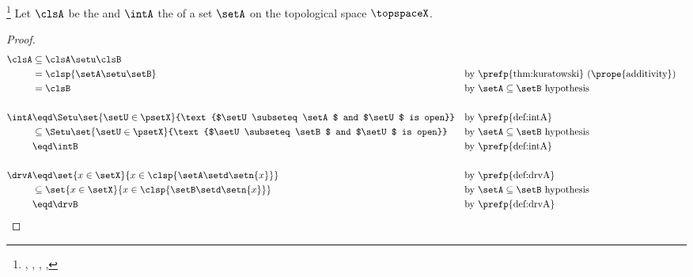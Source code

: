 \begin{theorem}
\footnote{
  , %
  ,
  , %
  ,
  }
\label{thm:clsA_isotone}
Let $\clsA$ be the  and $\intA$ the   of a set $\setA$ on the topological space $\topspaceX$.
\end{theorem}
\begin{proof}
\begin{align*}
  \clsA
    &\subseteq \clsA\setu\clsB
  \\&= \clsp{\setA\setu\setB}
    && \text{by \prefp{thm:kuratowski} (\prope{additivity})}
  \\&= \clsB
    && \text{by $\setA\subseteq\setB$ hypothesis} 
  \\
  \\
  \intA
    &\eqd \Setu\set{\setU\in\psetX}{\text{$\setU\subseteq\setA$ and $\setU$ is open}}
    &&    \text{by \prefp{def:intA}}
  \\&\subseteq \Setu\set{\setU\in\psetX}{\text{$\setU\subseteq\setB$ and $\setU$ is open}}
    && \text{by $\setA\subseteq\setB$ hypothesis} 
  \\&\eqd \intB
    &&    \text{by \prefp{def:intA}}
  \\
  \\
  \drvA
    &\eqd      \set{x\in\setX}{x\in\clsp{\setA\setd\setn{x}}}
    &&         \text{by \prefp{def:drvA}}
  \\&\subseteq \set{x\in\setX}{x\in\clsp{\setB\setd\setn{x}}}
    &&         \text{by $\setA\subseteq\setB$ hypothesis}
  \\&\eqd      \drvB
    &&         \text{by \prefp{def:drvA}}
\end{align*}
\end{proof}


